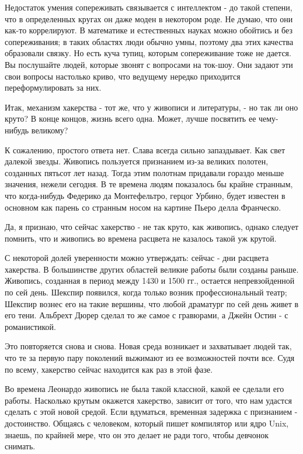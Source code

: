 \documentclass[ebook,12pt,oneside,openany]{memoir}
\begin{document}
Недостаток умения сопереживать связывается с интеллектом - до такой
степени, что в определенных кругах он даже моден в некотором роде. Не
думаю, что они как-то коррелируют. В математике и естественных науках
можно обойтись и без сопереживания; в таких областях люди обычно умны,
поэтому два этих качества образовали связку. Но есть куча тупиц,
которым сопереживание тоже не дается. Вы послушайте людей, которые
звонят с вопросами на ток-шоу. Они задают эти свои вопросы настолько
криво, что ведущему нередко приходится переформулировать за них.

Итак, механизм хакерства - тот же, что у живописи и литературы, - но
так ли оно круто? В конце концов, жизнь всего одна. Может, лучше
посвятить ее чему-нибудь великому?

К сожалению, простого ответа нет. Слава всегда сильно запаздывает. Как
свет далекой звезды. Живопись пользуется признанием из-за великих
полотен, созданных пятьсот лет назад. Тогда этим полотнам придавали
гораздо меньше значения, нежели сегодня. В те времена людям показалось
бы крайне странным, что когда-нибудь Федерико да Монтефельтро, герцог
Урбино, будет известен в основном как парень со странным носом на
картине Пьеро делла Франческо.

Да, я признаю, что сейчас хакерство - не так круто, как живопись,
однако следует помнить, что и живопись во времена расцвета не казалось
такой уж крутой.

С некоторой долей уверенности можно утверждать: сейчас - дни расцвета
хакерства. В большинстве других областей великие работы были созданы
раньше. Живопись, созданная в период между 1430 и 1500 гг., остается
непревзойденной по сей день. Шекспир появился, когда только возник
профессиональный театр; Шекспир вознес его на такие вершины, что любой
драматург по сей день живет в его тени. Альбрехт Дюрер сделал то же
самое с гравюрами, а Джейн Остин - с романистикой.

Это повторяется снова и снова. Новая среда возникает и захватывает
людей так, что те за первую пару поколений выжимают из ее возможностей
почти все. Судя по всему, хакерство сейчас находится как раз в этой
фазе.

Во времена Леонардо живопись не была такой классной, какой ее сделали
его работы. Насколько крутым окажется хакерство, зависит от того, что
нам удастся сделать с этой новой средой. Если вдуматься, временная
задержка с признанием - достоинство. Общаясь с человеком, который
пишет компилятор или ядро Unix, знаешь, по крайней мере, что он это
делает не ради того, чтобы девчонок снимать.
\end{document}
